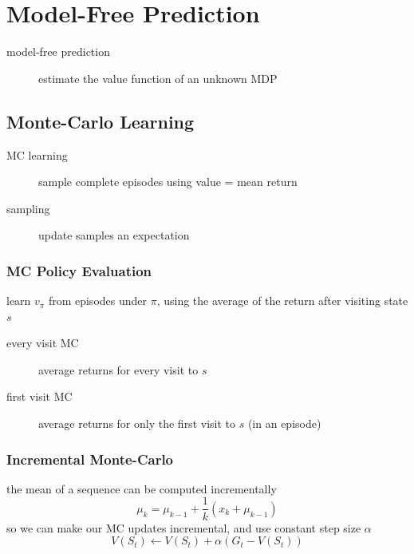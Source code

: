 \documentclass[]{article}
\theoremstyle{definition}
\begin{document}
\section{Model-Free Prediction}
\label{sec:model_free_prediction}

\begin{description}
    \item[model-free prediction] estimate the value function of an unknown MDP
\end{description}

\subsection{Monte-Carlo Learning}%
\label{sub:monte_carlo_learning}

\begin{description}
    \item[MC learning] sample complete episodes using value = mean return
    \item[sampling] update samples an expectation
\end{description}


\subsubsection{MC Policy Evaluation}
\label{ssub:mc_policy_evaluation}
learn $v_\pi$ from episodes under $\pi$, using the average of the return after visiting state $s$
\begin{description}
    \item[every visit MC] average returns for every visit to $s$
    \item[first visit MC] average returns for only the first visit to $s$ (in an episode)
\end{description}

\subsubsection{Incremental Monte-Carlo}%
\label{ssub:incremental_monte_carlo}
the mean of a sequence can be computed incrementally
\begin{equation*}
    \mu_k = \mu_{k-1} + \frac{1}{k}(x_k + \mu_{k-1})
\end{equation*}
so we can make our MC updates incremental, and use constant step size $\alpha$
\begin{equation*}
    V(S_t) \gets V(S_t) + \alpha (G_t - V(S_t))
\end{equation*}
\end{document}
